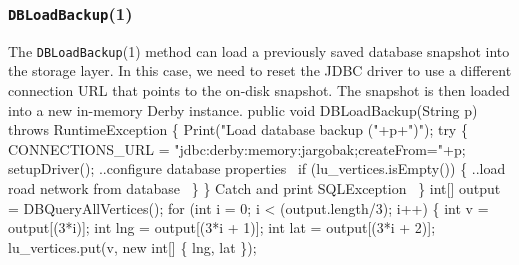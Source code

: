 \documentclass{article}
\def\nwendcode{\endtrivlist \endgroup}      %
\theoremstyle{definition}                   %
\begin{document}
\subsubsection{{\tt{}\protect{}DBLoadBackup}(1)}
The {\tt{}\protect{}DBLoadBackup}(1) method can load a previously saved database snapshot
into the storage layer. In this case, we need to reset the JDBC driver to use a
different connection URL that points to the on-disk snapshot. The snapshot is
then loaded into a new in-memory Derby instance.
\nwenddocs{}\endmoddef{}
public void DBLoadBackup(String p) throws RuntimeException \{
  Print("Load database backup ("+p+")");
  try \{
    CONNECTIONS_URL = "jdbc:derby:memory:jargobak;createFrom="+p;
    setupDriver();
    \LA{}..configure database properties~{\nwtagstyle{}}\RA{}
    if (lu_vertices.isEmpty()) \{
      \LA{}..load road network from database~{\nwtagstyle{}}\RA{}
    \}
  \}
  \LA{}Catch and print \code{}SQLException\edoc{}~{\nwtagstyle{}}\RA{}
\}
\eatline
{}\nwendcode{}\endmoddef{}
int[] output = DBQueryAllVertices();
for (int i = 0; i < (output.length/3); i++) \{
  int v = output[(3*i)];
  int lng = output[(3*i + 1)];
  int lat = output[(3*i + 2)];
  lu_vertices.put(v, new int[] \{ lng, lat \});
\end{document}

